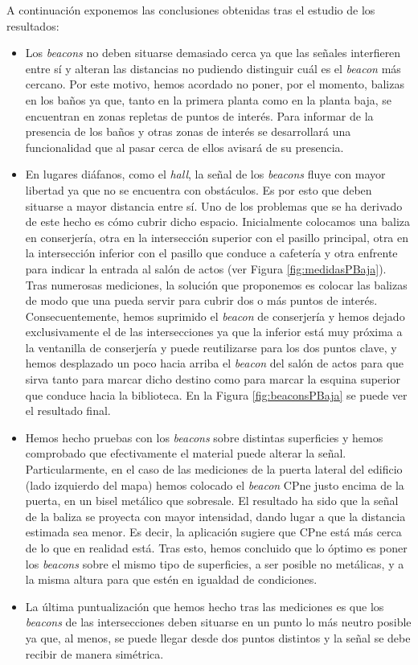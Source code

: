 A continuación exponemos las conclusiones obtenidas tras el estudio de los resultados:
\begin{itemize}
	\item Los \textit{beacons} no deben situarse demasiado cerca ya que las señales interfieren entre sí y alteran las distancias no pudiendo distinguir cuál es el \textit{beacon} más cercano. Por este motivo, hemos acordado no poner, por el momento, balizas en los baños ya que, tanto en la primera planta como en la planta baja, se encuentran en zonas repletas de puntos de interés. Para informar de la presencia de los baños y otras zonas de interés se desarrollará una funcionalidad que al pasar cerca de ellos avisará de su presencia.
	
	\item En lugares diáfanos, como el \textit{hall}, la señal de los \textit{beacons} fluye con mayor libertad ya que no se encuentra con obstáculos. Es por esto que deben situarse a mayor distancia entre sí. Uno de los problemas que se ha derivado de este hecho es cómo cubrir dicho espacio. Inicialmente colocamos una baliza en conserjería, otra en la intersección superior con el pasillo principal, otra en la intersección inferior con el pasillo que conduce a cafetería y otra enfrente para indicar la entrada al salón de actos (ver Figura \ref{fig:medidasPBaja}). Tras numerosas mediciones, la solución que proponemos es colocar las balizas de modo que una pueda servir para cubrir dos o más puntos de interés. Consecuentemente, hemos suprimido el \textit{beacon} de conserjería y hemos dejado exclusivamente el de las intersecciones ya que la inferior está muy próxima a la ventanilla de conserjería y puede reutilizarse para los dos puntos clave, y hemos desplazado un poco hacia arriba el \textit{beacon} del salón de actos para que sirva tanto para marcar dicho destino como para marcar la esquina superior que conduce hacia la biblioteca. En la Figura \ref{fig:beaconsPBaja} se puede ver el resultado final.
	
	\item Hemos hecho pruebas con los \textit{beacons} sobre distintas superficies y hemos comprobado que efectivamente el material puede alterar la señal. Particularmente, en el caso de las mediciones de la puerta lateral del edificio (lado izquierdo del mapa) hemos colocado el \textit{beacon} CPne justo encima de la puerta, en un bisel metálico que sobresale. El resultado ha sido que la señal de la baliza se proyecta con mayor intensidad, dando lugar a que la distancia estimada sea menor. Es decir, la aplicación sugiere que CPne está más cerca de lo que en realidad está. Tras esto, hemos concluido que lo óptimo es poner los \textit{beacons} sobre el mismo tipo de superficies, a ser posible no metálicas, y a la misma altura para que estén en igualdad de condiciones. 
	
	\item La última puntualización que hemos hecho tras las mediciones es que los \textit{beacons} de las intersecciones deben situarse en un punto lo más neutro posible ya que, al menos, se puede llegar desde dos puntos distintos y la señal se debe recibir de manera simétrica. 
\end{itemize}





